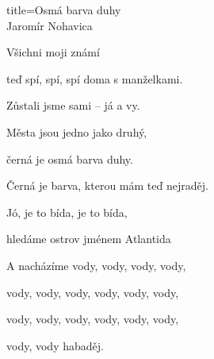 \begin{song}{title=\centering Osmá barva duhy \\\normalsize Jaromír Nohavica  \vspace*{-0.3cm}}
{\begin{minipage}[t]{0.48\textwidth}

\sloka
	Všichni moji známí
	
	teď spí, spí, spí doma s manželkami.

	Zůstali jsme sami -- já a vy.
	
	Města jsou jedno jako druhý,
	
	černá je osmá barva duhy.
	
	Černá je barva, kterou mám teď nejraděj.
	
	Jó, je to bída, je to bída,
	
	hledáme ostrov jménem Atlantida
	
	A nacházíme vody, vody, vody, vody,
	
	vody, vody, vody, vody, vody, vody,
	
	vody, vody, vody, vody, vody, vody,

	vody, vody habaděj. 

\end{minipage}
}
\setcounter{Slokočet}{0}
\end{song}
